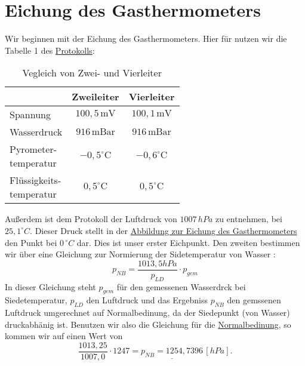 \twocolumn

\section{Eichung des Gasthermometers}
Wir beginnen mit der Eichung des Gasthermometers. Hier für nutzen wir die Tabelle 1 des \hyperref[Protokoll]{Protokolls}:

\begin{table}[h!]
    \begin{tabular}{l | c | c}
        & \textbf{Zweileiter} & \textbf{Vierleiter} \\
        \hline
        Spannung & $100,5\,\text{mV}$ & $100,1\,\text{mV}$ \\
        \hline
        Wasserdruck & $916\,\text{mBar}$ & $916\,\text{mBar}$ \\
        \hline
        \parbox{2.5cm}{Pyrometer- \\ temperatur} & $-0,5^\circ\text{C}$ & $-0,6^\circ\text{C}$ \\
        \hline
        \parbox{2.5cm}{Flüssigkeits- \\ temperatur} & $0,5^\circ\text{C}$ & $0,5^\circ\text{C}$
    \end{tabular}
    \label{tab:zweileiter_vierleiter}
    \caption{Vegleich von Zwei- und Vierleiter}
\end{table}

Außerdem ist dem Protokoll der Luftdruck von $1007 \, hPa$ zu entnehmen, bei $25,1^\circ C$. Dieser Druck stellt in der \hyperref[fig:graphisch_temp_druck]{Abbildung zur Eichung des Gasthermometers} den Punkt bei $0 \, ^\circ C$ dar.
Dies ist unser erster Eichpunkt. Den zweiten bestimmen wir über eine Gleichung zur Normierung der Sidetemperatur von Wasser \cite{skript25}:
\begin{equation}
    p_{NB} = \frac{1013,5 hPa}{p_{LD}} \cdot p_{gem}
    \label{eq:normal_siedepunkt}
\end{equation}
In dieser Gleichung steht $p_{gem}$ für den gemessenen Wasserdrck bei Siedetemperatur, $p_{LD}$ den Luftdruck und das Ergebniss $p_{NB}$ den gemssenen Luftdruck umgerechnet auf Normalbedinung, 
da der Siedepunkt (von Wasser) druckabhänig ist.
Benutzen wir also die Gleichung für die \hyperref[fig:graphisch_temp_druck]{Normalbedinung}, so kommen wir auf einen Wert von
\begin{equation}
    \frac{1013,25}{1007,0} \cdot 1247 = \underline{p_{NB} = 1254,7396} \, [hPa].
\end{equation}

